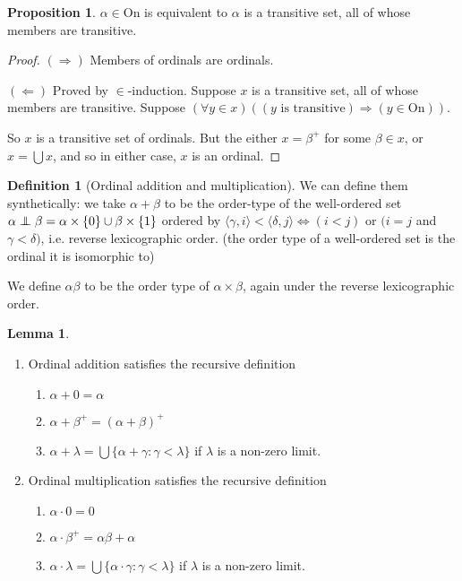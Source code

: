 \documentclass[a4paper]{article}
\theoremstyle{definition}
\newtheorem*{prop}{Proposition}
\newtheorem*{defi}{Definition}
\newtheorem*{lemma}{Lemma}
\newcommand{\On}{\mathrm{On}}
\newcommand{\bra}{\langle}
\newcommand{\ket}{\rangle}
\newcommand{\oadd}{\mathrel\bot\joinrel\mspace{-8mu}\mathrel\bot}
\begin{document}
\begin{prop}
  $\alpha\in \On$ is equivalent to $\alpha$ is a transitive set, all of whose members are transitive.
\end{prop}

\begin{proof}
  $(\Rightarrow)$ Members of ordinals are ordinals.

  $(\Leftarrow)$ Proved by $\in$-induction. Suppose $x$ is a transitive set, all of whose members are transitive.  Suppose $(\forall y\in x)((y\text{ is transitive})\Rightarrow (y\in \On))$.

So $x$ is a transitive set of ordinals. But the either $x = \beta^+$ for some $\beta\in x$, or $x = \bigcup x$, and so in either case, $x$ is an ordinal.
\end{proof}

\begin{defi}[Ordinal addition and multiplication]
  We can define them synthetically: we take $\alpha + \beta$ to be the order-type of the well-ordered set $\alpha\oadd \beta = \alpha\times\{0\}\cup \beta\times\{1\}$ ordered by $\bra \gamma, i\ket < \bra \delta, j\ket \Leftrightarrow (i < j)$ or $(i = j$ and $\gamma < \delta)$, i.e. reverse lexicographic order. (the order type of a well-ordered set is the ordinal it is isomorphic to)

  We define $\alpha\beta$ to be the order type of $\alpha\times \beta$, again under the reverse lexicographic order.
\end{defi}

\begin{lemma}\leavevmode
  \begin{enumerate}
  \item Ordinal addition satisfies the recursive definition
    \begin{enumerate}
    \item $\alpha + 0 = \alpha$
    \item $\alpha + \beta^+ = (\alpha + \beta)^+$
    \item $\alpha + \lambda = \bigcup\{\alpha + \gamma: \gamma < \lambda\}$ if $\lambda$ is a non-zero limit.
    \end{enumerate}
  \item Ordinal multiplication satisfies the recursive definition
    \begin{enumerate}
    \item $\alpha\cdot 0 = 0$
    \item $\alpha\cdot \beta^+ = \alpha\beta + \alpha$
    \item $\alpha\cdot \lambda = \bigcup\{\alpha\cdot \gamma: \gamma < \lambda\}$ if $\lambda$ is a non-zero limit.
    \end{enumerate}
  \end{enumerate}
\end{lemma}
\end{document}
